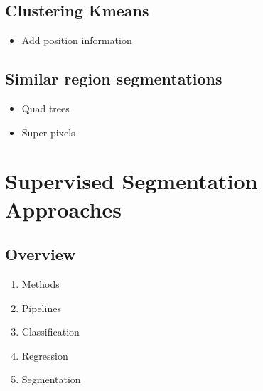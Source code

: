\documentclass[letterpaper,10pt,english]{sphinxmanual}
\begin{document}
\section{Clustering \sphinxhyphen{} K\sphinxhyphen{}means}
\label{\detokenize{05-AdvancedSegmentation:clustering-k-means}}\begin{itemize}
\item {} 
\sphinxAtStartPar
Add position information

\end{itemize}


\section{Similar region segmentations}
\label{\detokenize{05-AdvancedSegmentation:similar-region-segmentations}}\begin{itemize}
\item {} 
\sphinxAtStartPar
Quad trees

\item {} 
\sphinxAtStartPar
Super pixels

\end{itemize}


\chapter{Supervised Segmentation Approaches}
\label{\detokenize{05-SupervisedSegmentation:supervised-segmentation-approaches}}\label{\detokenize{05-SupervisedSegmentation::doc}}



\section{Overview}
\label{\detokenize{05-SupervisedSegmentation:overview}}\begin{enumerate}
%
\item {} 
\sphinxAtStartPar
Methods

\item {} 
\sphinxAtStartPar
Pipelines

\item {} 
\sphinxAtStartPar
Classification

\item {} 
\sphinxAtStartPar
Regression

\item {} 
\sphinxAtStartPar
Segmentation

\end{enumerate}
\end{document}
